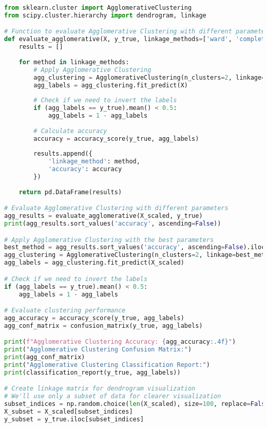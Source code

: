 \begin{lstlisting}[language=Python, caption=Agglomerative Clustering Implementation and Parameter Tuning]
from sklearn.cluster import AgglomerativeClustering
from scipy.cluster.hierarchy import dendrogram, linkage

# Function to evaluate Agglomerative Clustering with different parameters
def evaluate_agglomerative(X, y_true, linkage_methods=['ward', 'complete', 'average', 'single']):
    results = []
    
    for method in linkage_methods:
        # Apply Agglomerative Clustering
        agg_clustering = AgglomerativeClustering(n_clusters=2, linkage=method)
        agg_labels = agg_clustering.fit_predict(X)
        
        # Check if we need to invert the labels
        if (agg_labels == y_true).mean() < 0.5:
            agg_labels = 1 - agg_labels
            
        # Calculate accuracy
        accuracy = accuracy_score(y_true, agg_labels)
        
        results.append({
            'linkage_method': method,
            'accuracy': accuracy
        })
    
    return pd.DataFrame(results)

# Evaluate Agglomerative Clustering with different parameters
agg_results = evaluate_agglomerative(X_scaled, y_true)
print(agg_results.sort_values('accuracy', ascending=False))

# Apply Agglomerative Clustering with the best parameters
best_method = agg_results.sort_values('accuracy', ascending=False).iloc[0]['linkage_method']
agg_clustering = AgglomerativeClustering(n_clusters=2, linkage=best_method)
agg_labels = agg_clustering.fit_predict(X_scaled)

# Check if we need to invert the labels
if (agg_labels == y_true).mean() < 0.5:
    agg_labels = 1 - agg_labels

# Evaluate clustering performance
agg_accuracy = accuracy_score(y_true, agg_labels)
agg_conf_matrix = confusion_matrix(y_true, agg_labels)

print(f"Agglomerative Clustering Accuracy: {agg_accuracy:.4f}")
print("Agglomerative Clustering Confusion Matrix:")
print(agg_conf_matrix)
print("Agglomerative Clustering Classification Report:")
print(classification_report(y_true, agg_labels))

# Create linkage matrix for dendrogram visualization
# We'll use only a subset of data for clearer visualization
subset_indices = np.random.choice(len(X_scaled), size=100, replace=False)
X_subset = X_scaled[subset_indices]
y_subset = y_true.iloc[subset_indices]


\end{lstlisting}
